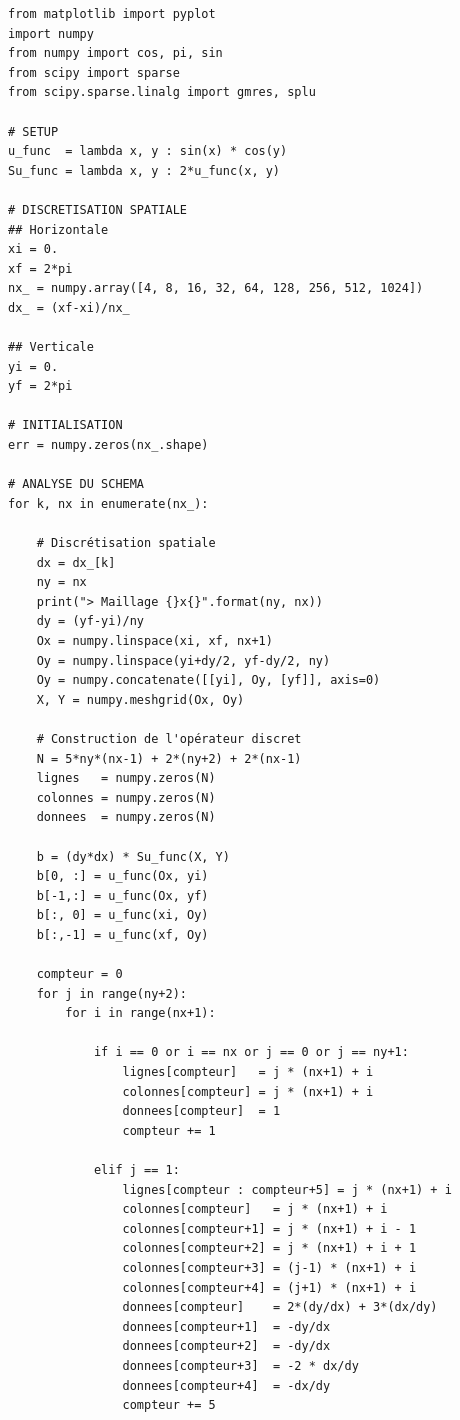 \begin{verbatim}
from matplotlib import pyplot
import numpy
from numpy import cos, pi, sin
from scipy import sparse
from scipy.sparse.linalg import gmres, splu

# SETUP
u_func  = lambda x, y : sin(x) * cos(y)
Su_func = lambda x, y : 2*u_func(x, y)

# DISCRETISATION SPATIALE
## Horizontale
xi = 0.
xf = 2*pi
nx_ = numpy.array([4, 8, 16, 32, 64, 128, 256, 512, 1024])
dx_ = (xf-xi)/nx_

## Verticale
yi = 0.
yf = 2*pi

# INITIALISATION
err = numpy.zeros(nx_.shape)

# ANALYSE DU SCHEMA
for k, nx in enumerate(nx_):
    
    # Discrétisation spatiale
    dx = dx_[k]
    ny = nx
    print("> Maillage {}x{}".format(ny, nx))
    dy = (yf-yi)/ny
    Ox = numpy.linspace(xi, xf, nx+1)
    Oy = numpy.linspace(yi+dy/2, yf-dy/2, ny)
    Oy = numpy.concatenate([[yi], Oy, [yf]], axis=0)
    X, Y = numpy.meshgrid(Ox, Oy)
    
    # Construction de l'opérateur discret
    N = 5*ny*(nx-1) + 2*(ny+2) + 2*(nx-1)
    lignes   = numpy.zeros(N)
    colonnes = numpy.zeros(N)
    donnees  = numpy.zeros(N)
    
    b = (dy*dx) * Su_func(X, Y)
    b[0, :] = u_func(Ox, yi)
    b[-1,:] = u_func(Ox, yf)
    b[:, 0] = u_func(xi, Oy)
    b[:,-1] = u_func(xf, Oy)

    compteur = 0
    for j in range(ny+2):
        for i in range(nx+1):
                
            if i == 0 or i == nx or j == 0 or j == ny+1:
                lignes[compteur]   = j * (nx+1) + i
                colonnes[compteur] = j * (nx+1) + i
                donnees[compteur]  = 1
                compteur += 1
   
            elif j == 1:
                lignes[compteur : compteur+5] = j * (nx+1) + i
                colonnes[compteur]   = j * (nx+1) + i
                colonnes[compteur+1] = j * (nx+1) + i - 1
                colonnes[compteur+2] = j * (nx+1) + i + 1
                colonnes[compteur+3] = (j-1) * (nx+1) + i
                colonnes[compteur+4] = (j+1) * (nx+1) + i
                donnees[compteur]    = 2*(dy/dx) + 3*(dx/dy)
                donnees[compteur+1]  = -dy/dx
                donnees[compteur+2]  = -dy/dx
                donnees[compteur+3]  = -2 * dx/dy
                donnees[compteur+4]  = -dx/dy
                compteur += 5
            

\end{verbatim}
